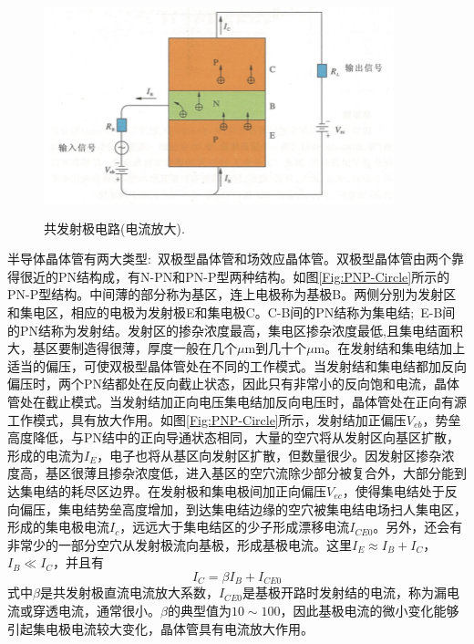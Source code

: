 \begin{figure}[h!]
\centering
\vspace*{-0.10in}
\includegraphics[height=2.50in,width=4.00in,viewport=0 0 90 55,clip]{Figures/PNP-circle.png}
\caption{\small \textrm{共发射极电路(电流放大).}}%
\label{Fig:PNP_Circle}
\end{figure} 
半导体晶体管有两大类型:~双极型晶体管和场效应晶体管。双极型晶体管由两个靠得很近的PN结构成，有N-PN和PN-P型两种结构。如图\ref{Fig:PNP-Circle}所示的PN-P型结构。中间薄的部分称为基区，连上电极称为基极B。两侧分别为发射区和集电区，相应的电极为发射极E和集电极C。C-B间的PN结称为集电结;~E-B间的PN结称为发射结。发射区的掺杂浓度最高，集电区掺杂浓度最低,且集电结面积大，基区要制造得很薄，厚度一般在几个$\mu\mathrm{m}$到几十个$\mu\mathrm{m}$。在发射结和集电结加上适当的偏压，可使双极型晶体管处在不同的工作模式。当发射结和集电结都加反向偏压时，两个PN结都处在反向截止状态，因此只有非常小的反向饱和电流，晶体管处在截止模式。当发射结加正向电压集电结加反向电压时，晶体管处在正向有源工作模式，具有放大作用。如图\ref{Fig:PNP-Circle}所示，发射结加正偏压$V_{eb}$，势垒高度降低，与PN结中的正向导通状态相同，大量的空穴将从发射区向基区扩散，形成的电流为$I_E$，电子也将从基区向发射区扩散，但数量很少。因发射区掺杂浓度高，基区很薄且掺杂浓度低，进入基区的空穴流除少部分被复合外，大部分能到达集电结的耗尽区边界。在发射极和集电极间加正向偏压$V_{ec}$，使得集电结处于反向偏压，集电结势垒高度增加，到达集电结边缘的空穴被集电结电场扫人集电区，形成的集电极电流$I_c$，远远大于集电结区的少子形成漂移电流$I_{CE0}$。另外，还会有非常少的一部分空穴从发射极流向基极，形成基极电流。这里$I_E\approx I_B+I_C$，$I_B\ll I_C$，并且有
\begin{equation}
	I_C=\beta I_B+I_{CE0}
	\label{eq:Integrated-Current}
\end{equation}
式中$\beta$是共发射极直流电流放大系数，$I_{CE0}$是基极开路时发射结的电流，称为漏电流或穿透电流，通常很小。$\beta$的典型值为$10\sim100$，因此基极电流的微小变化能够引起集电极电流较大变化，晶体管具有电流放大作用。

